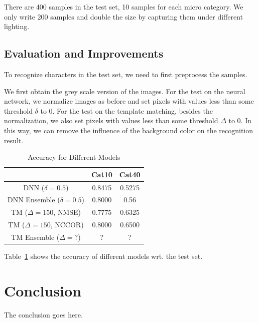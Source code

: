 \documentclass[journal]{IEEEtran}
\begin{document}
There are 400 samples in the test set, 10 samples for each micro category.
We only write 200 samples and double the size by capturing them under different lighting.

\subsection{Evaluation and Improvements}
To recognize characters in the test set, we need to first preprocess the samples.

We first obtain the grey scale version of the images.
For the test on the neural network, we normalize images as before and set pixels with values less than some threshold $\delta$ to 0.
For the test on the template matching, besides the normalization, we also set pixels with values less than some threshold $\Delta$ to 0.
In this way, we can remove the influence of the background color on the recognition result.

\begin{table}[h]
	\centering
	\caption{Accuracy for Different Models}
	\label{tab:result}
	\begin{tabular}{|c|c|c|}
		\hline
		                            & Cat10  & Cat40  \\\hline
		DNN ($\delta=0.5$)          & 0.8475 & 0.5275 \\\hline
		DNN Ensemble ($\delta=0.5$) & 0.8000 & 0.56   \\\hline
		TM ($\Delta=150$, NMSE)     & 0.7775 & 0.6325 \\\hline
		TM ($\Delta=150$, NCCOR)    & 0.8000 & 0.6500 \\\hline
		TM Ensemble ($\Delta=?$)    & ?      & ?      \\\hline
	\end{tabular}
\end{table}

Table~\ref{tab:result} shows the accuracy of different models wrt. the test set.

\section{Conclusion}
The conclusion goes here.





\end{document}

